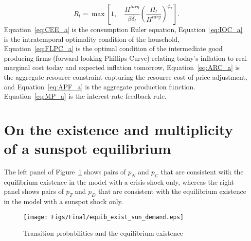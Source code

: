 \documentclass[11pt]{article}
\begin{document}
\begin{singlespace}
		\begin{equation}
			R_{t} = \max \left[1, \quad\frac{\Pi^{targ}}{\beta\delta_t}\left(\frac{\Pi_{t}}{\Pi^{targ}}\right)^{\phi_{\pi}}\right]. \label{eq:MP_a}
		\end{equation}
		\normalsize{Equation~\ref{eq:CEE_a} is the consumption Euler equation, Equation~\ref{eq:IOC_a} is the intratemporal optimality condition of the household, Equation~\ref{eq:FLPC_a} is the optimal condition of the intermediate good producing firms (forward-looking Phillips Curve) relating today's inflation to real marginal cost today and expected inflation tomorrow, Equation~\ref{eq:ARC_a} is the aggregate resource constraint capturing the resource cost of price adjustment, and Equation~\ref{eq:APF_a} is the aggregate production function. Equation~\ref{eq:MP_a} is the interest-rate feedback rule.}


		\section{On the existence and multiplicity of a sunspot equilibrium}
		\label{A:Existence}

		The left panel of Figure~\ref{fig:Existence} shows pairs of $p_{N}$ and $p_{C}$ that are consistent with the equilibrium existence in the model with a crisis shock only, whereas the right panel shows pairs of $p_{T}$ and $p_{D}$ that are consistent with the equilibrium existence in the model with a sunspot shock only.

		\begin{figure}[!ht]
			\begin{center}
				\caption{Transition probabilities and the equilibrium existence\label{fig:Existence}}
				\texttt{[image: Figs/Final/equib\_exist\_sun\_demand.eps]}\\
			\end{center}
		\end{figure}


\end{singlespace}
\end{document}
